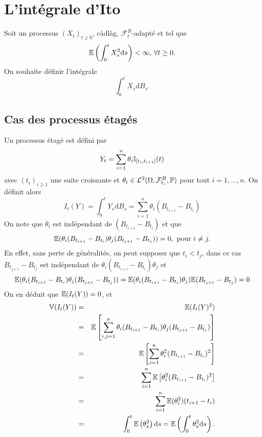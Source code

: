 \section{L'intégrale d'Ito}\label{sec:ito_integral}
Soit un processus $(X_t)_{t\geq 0}$, càdlàg, $\mathcal{F}^B_t$-adapté et tel que 
$$
\mathbb{E}\left(\int_0^t X_s^2\text{d}s\right)<\infty\text{,  }\forall t\geq 0.
$$
On souhaite définir l'intégrale 
$$
\int_0^t X_s\text{d}B_s.
$$
\subsection{Cas des processus étagés}
Un processus étagé est défini par
$$
Y_t = \sum_{i=1}^n\theta_i\mathbb{I}_{]t_i,t_{i+1}]}(t)
$$
avec $(t_i)_{i\geq 1}$ une suite croissante et $\theta_i\in \mathcal{L}^2(\Omega,\mathcal{F}^B_{t_i},\mathbb{P})$ pour tout $i=1,\ldots, n$. On définit alors 
$$
I_t(Y) = \int_{0}^t Y_s\text{d}B_s = \sum_{i=1}^n\theta_i(B_{t_{i+1}}-B_{t_i})
$$
On note que $\theta_i$ est indépendant de $(B_{t_{i+1}}-B_{t_{i}})$ et que 
$$
\mathbb{E}(\theta_i(B_{t_{i+1}}-B_{t_{i}})\theta_j(B_{t_{j+1}}-B_{t_{j}})) = 0, \text{ pour }i\neq j.
$$
En effet, sans perte de généralités, on peut supposer que $t_{i} < t_{j}$, dans ce cas $B_{t_{j+1}}-B_{t_{j}}$ est indépendant de $\theta_i(B_{t_{i+1}}-B_{t_{i}})\theta_j$ et 
$$\mathbb{E}(\theta_i(B_{t_{i+1}}-B_{t_{i}})\theta_j(B_{t_{j+1}}-B_{t_{j}})) = \mathbb{E}(\theta_i(B_{t_{i+1}}-B_{t_{i}})\theta_j)\mathbb{E}(B_{t_{j+1}}-B_{t_{j}}) = 0$$
On en déduit que $\mathbb{E}(I_t(Y)) = 0$, et 
\begin{eqnarray*}
\mathbb{V}(I_t(Y)) &=& \mathbb{E}(I_t(Y)^2)\\
&=& \mathbb{E}\left[\sum_{i,j = 1}^n\theta_i(B_{t_{i+1}}-B_{t_{i}})\theta_j(B_{t_{j+1}}-B_{t_{j}})\right]\\
&=& \mathbb{E}\left[\sum_{i = 1}^n\theta_i^2(B_{t_{i+1}}-B_{t_{i}})^2\right]\\
&=& \sum_{i = 1}^n\mathbb{E}\left[\theta_i^2(B_{t_{i+1}}-B_{t_{i}})^2\right]\\
&=& \sum_{i = 1}^n\mathbb{E}(\theta_i^2)(t_{i+1}-t_{i})\\
&=& \int_0^t\mathbb{E}\left(\theta^2_s\right)\text{d}s = \mathbb{E}\left(\int_0^t\theta^2_s\text{d}s\right). \\
\end{eqnarray*}

